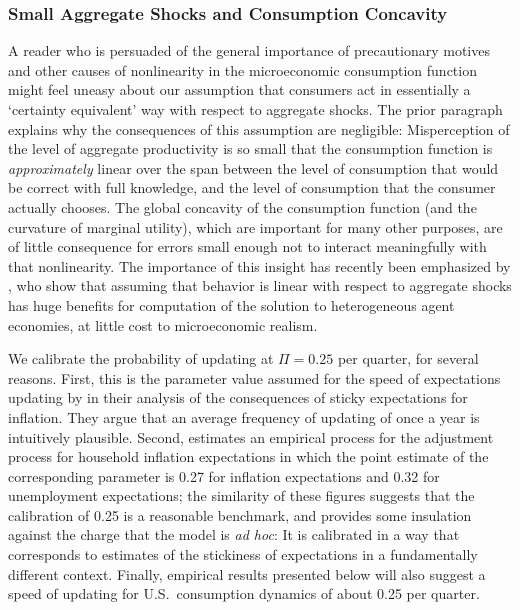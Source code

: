 \documentclass[titlepage]{./econtex}
\begin{document}
\hypertarget{ConcavityAggImp}{}
\subsubsection{Small Aggregate Shocks and Consumption Concavity}
A reader who is persuaded of the general importance of precautionary motives and other causes of nonlinearity in the microeconomic consumption function might feel uneasy about our assumption that consumers act in essentially a `certainty equivalent' way with respect to aggregate shocks.  The prior paragraph explains why the consequences of this assumption are negligible: Misperception of the level of aggregate productivity is so small that the consumption function is \textit{approximately} linear over the span between the level of consumption that would be correct with full knowledge, and the level of consumption that the consumer actually chooses.  The global concavity of the consumption function (and the curvature of marginal utility), which are important for many other purposes, are of little consequence for errors small enough not to interact meaningfully with that nonlinearity.  The importance of this insight has recently been emphasized by \cite{bmpMITshocks}, who show that assuming that behavior is linear with respect to aggregate shocks has huge benefits for computation of the solution to heterogeneous agent economies, at little cost to microeconomic realism.

We calibrate the probability of updating at $\Pi= %
0.25 %
 $ per quarter, for several reasons.  First, this is the parameter value assumed for the speed of expectations updating by \cite{mrSlumps} in their analysis of the consequences of sticky expectations for inflation.  They argue that an average frequency of updating of once a year is intuitively plausible.  Second, \cite{carroll:epidemicinflQJE} estimates an empirical process for the adjustment process for household inflation expectations in which the point estimate of the corresponding parameter is 0.27 for inflation expectations and 0.32 for unemployment expectations; the similarity of these figures suggests that the \cite{mrSlumps} calibration of 0.25 is a reasonable benchmark, and provides some insulation against the charge that the model is {\it ad hoc}: It is calibrated in a way that corresponds to estimates of the stickiness of expectations in a fundamentally different context.  Finally, empirical results presented below will also suggest a speed of updating for U.S.\ consumption dynamics of about 0.25 per quarter.
\end{document}
